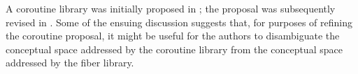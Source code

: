 A coroutine library was initially proposed in \doc; the proposal was
subsequently revised in \docr. Some of the ensuing discussion suggests that,
for purposes of refining the coroutine proposal, it might be useful for the
authors to disambiguate the conceptual space addressed by the coroutine
library from the conceptual space addressed by the fiber library.
